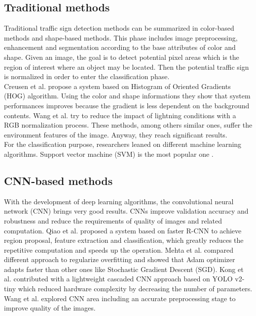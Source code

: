\documentclass[10pt,twocolumn,letterpaper]{article}
\begin{document}
\subsection{Traditional methods}
Traditional traffic sign detection methods can be summarized in color-based methods and shape-based methods. This phase includes image preprocessing, enhancement and segmentation according to the base attributes of color and shape. Given an image, the goal is to detect potential pixel areas which is the region of interest where an object may be located. Then the potential traffic sign is normalized in order to enter the classification phase.\\
Creusen et al. \cite{CreusenHog} propose a system based on Histogram of Oriented Gradients (HOG) algorithm. Using the color and shape informations they show that system performances improves because the gradient is less dependent on the background contents. Wang et al. \cite{WangRGB} try to reduce the impact of lightning conditions with a RGB normalization process. These methods, among others similar ones, suffer the environment features of the image. Anyway, they reach significant results.\\
For the classification purpose, researchers leaned on different machine learning algorithms. Support vector machine (SVM) is the most popular one \cite{soendoroSVM, greenSVM, rashidSVM}.

\subsection{CNN-based methods}
With the development of deep learning algorithms, the convolutional neural network (CNN) brings very good results. CNNs improve validation accuracy and robustness and reduce the requirements of quality of images and related computation. Qiao et al. \cite{qiaoCNN} proposed a system based on faster R-CNN to achieve region proposal, feature extraction and classification, which greatly reduces the repetitive computation and speeds up the operation. Mehta et al. \cite{mehtaCNN} compared different approach to regularize overfitting and showed that Adam optimizer adapts faster than other ones like Stochastic Gradient Descent (SGD). Kong et al. \cite{kongCNN} contributed with a lightweight cascaded CNN approach based on YOLO v2-tiny which reduced hardware complexity by decreasing the number of parameters.
Wang et al. \cite{wangCNN} explored CNN area including an accurate preprocessing stage to improve quality of the images.
\end{document}
